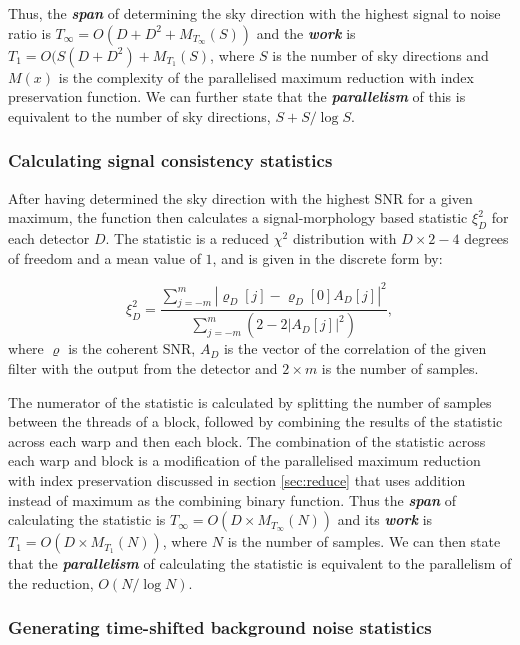 \documentclass{article}
\begin{document}
Thus, the \textit{\textbf{span}} of determining the sky direction with the highest signal to noise ratio is \(T_\infty = O(D + D^2 + M_{T_\infty}(S))\) and the \textit{\textbf{work}} is \(T_1 = O(S(D + D^2) + M_{T_1}(S)\), where \(S\) is the number of sky directions and \(M(x)\) is the complexity of the parallelised maximum reduction with index preservation function.
We can further state that the \textit{\textbf{parallelism}} of this is equivalent to the number of sky directions, \(S + S/\log S\).

\subsubsection{Calculating signal consistency statistics} \label{sec:stat}

After having determined the sky direction with the highest SNR for a given maximum, the function then calculates a signal-morphology based statistic \(\xi_D^2\) for each detector \(D\).
The statistic is a reduced \(\chi^2\) distribution with \(D\times2 - 4\) degrees of freedom and a mean value of \(1\), and is given in the discrete form by:

\[
    \xi_D^2 = \frac{\sum_{j = -m}^{m} | \varrho_D[j] - \varrho_D[0] A_D[j]|^2}{\sum_{j = -m}^{m} (2 - 2|A_D[j]|^2)},
\]
where \(\varrho\) is the coherent SNR, \(A_D\) is the vector of the correlation of the given filter with the output from the detector and \(2\times{m}\) is the number of samples.

The numerator of the statistic is calculated by splitting the number of samples between the threads of a block, followed by combining the results of the statistic across each warp and then each block.
The combination of the statistic across each warp and block is a modification of the parallelised maximum reduction with index preservation discussed in section \ref{sec:reduce} that uses addition instead of maximum as the combining binary function.
Thus the \textit{\textbf{span}} of calculating the statistic is \(T_\infty = O(D\times{M_{T_\infty}(N)})\) and its \textit{\textbf{work}} is \(T_1 = O(D\times{M_{T_1}(N)})\), where \(N\) is the number of samples.
We can then state that the \textit{\textbf{parallelism}} of calculating the statistic is equivalent to the parallelism of the reduction, \(O(N/\log N)\).

\subsubsection{Generating time-shifted background noise statistics} \label{sec:background}
\end{document}
